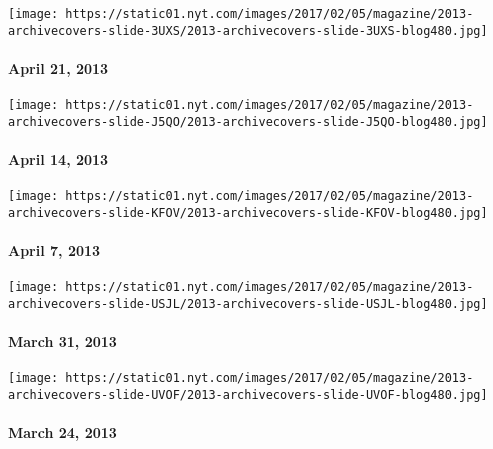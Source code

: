 \href{http://www.nytimes.com/indexes/2013/04/21/magazine/index.html}{}

\texttt{[image: https://static01.nyt.com/images/2017/02/05/magazine/2013-archivecovers-slide-3UXS/2013-archivecovers-slide-3UXS-blog480.jpg]}

\hypertarget{april-21-2013}{%
\paragraph{April 21, 2013}\label{april-21-2013}}

\href{http://www.nytimes.com/indexes/2013/04/14/magazine/index.html}{}

\texttt{[image: https://static01.nyt.com/images/2017/02/05/magazine/2013-archivecovers-slide-J5QO/2013-archivecovers-slide-J5QO-blog480.jpg]}

\hypertarget{april-14-2013}{%
\paragraph{April 14, 2013}\label{april-14-2013}}

\href{http://www.nytimes.com/indexes/2013/04/07/magazine/index.html}{}

\texttt{[image: https://static01.nyt.com/images/2017/02/05/magazine/2013-archivecovers-slide-KFOV/2013-archivecovers-slide-KFOV-blog480.jpg]}

\hypertarget{april-7-2013}{%
\paragraph{April 7, 2013}\label{april-7-2013}}

\href{http://www.nytimes.com/indexes/2013/03/31/magazine/index.html}{}

\texttt{[image: https://static01.nyt.com/images/2017/02/05/magazine/2013-archivecovers-slide-USJL/2013-archivecovers-slide-USJL-blog480.jpg]}

\hypertarget{march-31-2013}{%
\paragraph{March 31, 2013}\label{march-31-2013}}

\href{http://www.nytimes.com/indexes/2013/03/24/magazine/index.html}{}

\texttt{[image: https://static01.nyt.com/images/2017/02/05/magazine/2013-archivecovers-slide-UVOF/2013-archivecovers-slide-UVOF-blog480.jpg]}

\hypertarget{march-24-2013}{%
\paragraph{March 24, 2013}\label{march-24-2013}}

